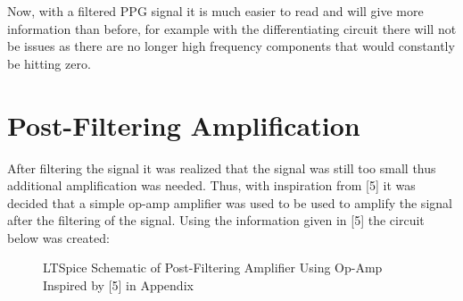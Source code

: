 \documentclass{article}
\begin{document}
Now, with a filtered PPG signal it is much easier to read and will give more information than before, for example with the differentiating circuit there will not be issues as there are no longer high frequency components that would constantly be hitting zero.
\newpage


\section{Post-Filtering Amplification}
After filtering the signal it was realized that the signal was still too small thus additional amplification was needed. Thus, with inspiration from [5] it was decided that a simple op-amp amplifier was used to be used to amplify the signal after the filtering of the signal. Using the information given in [5] the circuit below was created:
\begin{figure}[h]
    \centering
    \caption{LTSpice Schematic of Post-Filtering Amplifier Using Op-Amp Inspired by [5] in Appendix}
    \label{figure:PostFilterAmpLTSpice}
\end{figure}
\newpage
\end{document}
